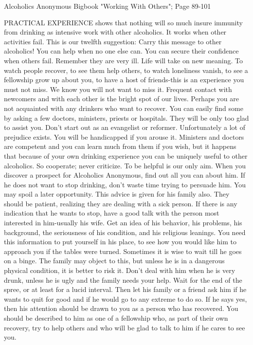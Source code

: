 
Alcoholics Anonymous Bigbook "Working With Others"; Page 89-101

\begin{biblechapter}
PRACTICAL EXPERIENCE shows that nothing will so much insure immunity from drinking as intensive work with other alcoholics.  It works when other activities fail.  This is our twelfth suggestion: Carry this message to other alcoholics!  You can help when no one else can.  You can secure their confidence when others fail.  Remember they are very ill.
Life will take on new meaning.  To watch people recover, to see them help others, to watch loneliness vanish, to see a fellowship grow up about you, to have a host of friends-this is an experience you must not miss.  We know you will not want to miss it.  Frequent contact with newcomers and with each other is the bright spot of our lives.
Perhaps you are not acquainted with any drinkers who want to recover.  You can easily find some by asking a few doctors, ministers, priests or hospitals.  They will be only too glad to assist you.  Don't start out as an evangelist or reformer.  Unfortunately a lot of prejudice exists.  You will be handicapped if you arouse it.  Ministers and doctors are competent and you can learn much from them if you wish, but it happens that because of your own drinking experience you can be uniquely useful to other alcoholics.  So cooperate; never criticize.  To be helpful is our only aim.
When you discover a prospect for Alcoholics Anonymous, find out all you can about him.  If he does not want to stop drinking, don't waste time trying to persuade him.  You may spoil a later opportunity.  This advice is given for his family also.  They should be patient, realizing they are dealing with a sick person.
If there is any indication that he wants to stop,  have a good talk with the person most interested in him-usually his wife.  Get an idea of his behavior, his problems, his background, the seriousness of his condition, and his religious leanings.  You need this information to put yourself in his place, to see how you would like him to approach you if the tables were turned.
Sometimes it is wise to wait till he goes on a binge.  The family may object to this, but unless he is in a dangerous physical condition, it is better to risk it.  Don't deal with him when he is very drunk, unless he is ugly and the family needs your help.  Wait for the end of the spree, or at least for a lucid interval.  Then let his family or a friend ask him if he wants to quit for good and if he would go to any extreme to do so.  If he says yes, then his attention should be drawn to you as a person who has recovered.  You should be described to him as one of a fellowship who, as part of their own recovery, try to help others and who will be glad to talk to him if he cares to see you.

\end{biblechapter}
